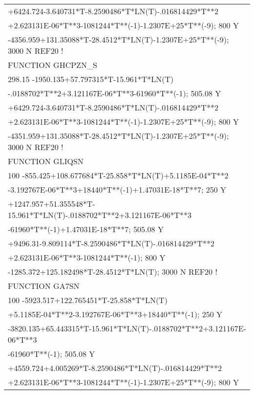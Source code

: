 \begin{longtable}[H]{ l l l }
	\multicolumn{3}{l}{+6424.724-3.640731*T-8.2590486*T*LN(T)-.016814429*T**2}\\
	\multicolumn{3}{l}{+2.623131E-06*T**3-1081244*T**(-1)-1.2307E+25*T**(-9); 800 Y}\\
	\multicolumn{3}{l}{-4356.959+131.35088*T-28.4512*T*LN(T)-1.2307E+25*T**(-9); 3000 N REF20 !}\\
	FUNCTION GHCPZN\_S & & \\
	\multicolumn{3}{l}{298.15 -1950.135+57.797315*T-15.961*T*LN(T)}\\
	\multicolumn{3}{l}{-.0188702*T**2+3.121167E-06*T**3-61960*T**(-1); 505.08 Y}\\
	\multicolumn{3}{l}{+6429.724-3.640731*T-8.2590486*T*LN(T)-.016814429*T**2}\\
	\multicolumn{3}{l}{+2.623131E-06*T**3-1081244*T**(-1)-1.2307E+25*T**(-9); 800 Y}\\
	\multicolumn{3}{l}{-4351.959+131.35088*T-28.4512*T*LN(T)-1.2307E+25*T**(-9); 3000 N REF20 !}\\
	FUNCTION GLIQSN & & \\
	\multicolumn{3}{l}{100 -855.425+108.677684*T-25.858*T*LN(T)+5.1185E-04*T**2}\\
	\multicolumn{3}{l}{-3.192767E-06*T**3+18440*T**(-1)+1.47031E-18*T**7; 250 Y}\\
	\multicolumn{3}{l}{+1247.957+51.355548*T-15.961*T*LN(T)-.0188702*T**2+3.121167E-06*T**3}\\
	\multicolumn{3}{l}{-61960*T**(-1)+1.47031E-18*T**7; 505.08 Y}\\
	\multicolumn{3}{l}{+9496.31-9.809114*T-8.2590486*T*LN(T)-.016814429*T**2}\\
	\multicolumn{3}{l}{+2.623131E-06*T**3-1081244*T**(-1); 800 Y}\\
	\multicolumn{3}{l}{-1285.372+125.182498*T-28.4512*T*LN(T); 3000 N REF20 !}\\
	FUNCTION GA7SN & & \\
	\multicolumn{3}{l}{100 -5923.517+122.765451*T-25.858*T*LN(T)}\\
	\multicolumn{3}{l}{+5.1185E-04*T**2-3.192767E-06*T**3+18440*T**(-1); 250 Y}\\
	\multicolumn{3}{l}{-3820.135+65.443315*T-15.961*T*LN(T)-.0188702*T**2+3.121167E-06*T**3}\\
	\multicolumn{3}{l}{-61960*T**(-1); 505.08 Y}\\
	\multicolumn{3}{l}{+4559.724+4.005269*T-8.2590486*T*LN(T)-.016814429*T**2}\\
	\multicolumn{3}{l}{+2.623131E-06*T**3-1081244*T**(-1)-1.2307E+25*T**(-9); 800 Y}\\

\end{longtable}
